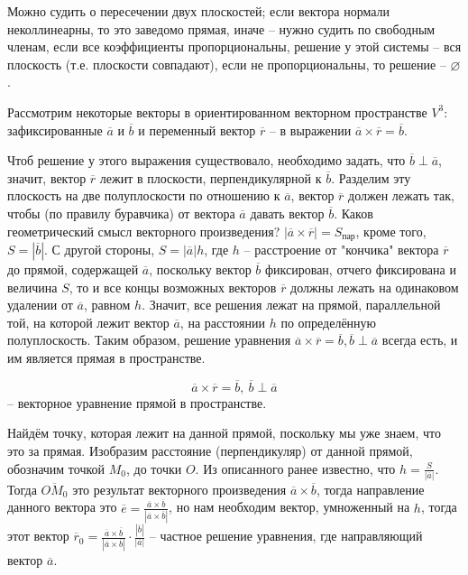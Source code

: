 	\begin{Rem}
		Можно судить о пересечении двух плоскостей; если вектора нормали неколлинеарны, то это заведомо прямая, иначе -- нужно судить по свободным членам, 
		если все коэффициенты пропорциональны, решение у этой системы -- вся плоскость (т.е. плоскости совпадают), если не пропорциональны, то решение -- $\varnothing$.
	\end{Rem}

	Рассмотрим некоторые векторы в ориентированном векторном пространстве $V^3$: зафиксированные $\overline{a}$ и $\overline{b}$ и переменный вектор $\overline{r}$ -- 
	в выражении $\overline{a}\times \overline{r} = \overline{b}$. 
	
	\begin{figure*}[h]
		\centering
		\def\svgwidth{0.4\columnwidth}
		
	\end{figure*}

	Чтоб решение у этого выражения существовало, необходимо задать, что $\overline{b} \perp \overline{a}$, 
	значит, вектор $\overline{r}$ лежит в плоскости, перпендикулярной к $\overline{b}$. Разделим эту плоскость на две полуплоскости по отношению к $\overline{a}$, 
	вектор $\overline{r}$ должен лежать так, чтобы (по правилу буравчика) от вектора $\overline{a}$ давать вектор $\overline{b}$. 
	Каков геометрический смысл векторного произведения? $|\overline{a} \times \overline{r}| = S_{\text{пар}}$, кроме того, $S = |\overline{b}|$. 
	С другой стороны, $S = |\overline{a}| h$, где $h$ -- расстроение от "кончика" вектора $\overline{r}$ до прямой, содержащей $\overline{a}$, поскольку вектор $\overline{b}$ фиксирован,
	отчего фиксирована и величина $S$, то и все концы возможных векторов $\overline{r}$ должны лежать на одинаковом удалении от $\overline{a}$, равном $h$. 
	Значит, все решения лежат на прямой, параллельной той, на которой лежит вектор $\overline{a}$, на расстоянии $h$ по определённую полуплоскость.
	Таким образом, решение уравнения $\overline{a}\times \overline{r} = \overline{b}, \overline{b} \perp \overline{a}$ всегда есть, и им является прямая в пространстве.\\ 
	
	\begin{Def}
		$$\overline{a} \times \overline{r} = \overline{b}, \ \overline{b} \perp \overline{a}$$ -- векторное уравнение прямой в пространстве.
	\end{Def}

	Найдём точку, которая лежит на данной прямой, поскольку мы уже знаем, что это за прямая.
	Изобразим расстояние (перпендикуляр) от данной прямой, обозначим точкой $M_0$, до точки $O$. Из описанного ранее известно, что $h = \frac{S}{|\overline{a}|}$. 
	Тогда $\overline{OM_0}$ это результат векторного произведения $\overline{a} \times \overline{b}$, тогда направление данного вектора это $\overline{e} = \frac{\overline{a} \times \overline{b}}{|\overline{a} \times \overline{b}|}$,
	но нам необходим вектор, умноженный на $h$, тогда этот вектор $\overline{r}_0 = \frac{\overline{a} \times \overline{b}}{|\overline{a} \times \overline{b}|} \cdot \frac{|\overline{b}|}{|\overline{a}|}$ -- частное решение уравнения, где направляющий вектор $\overline{a}$. 

	\begin{figure*}[h]
		\centering
		\def\svgwidth{0.4\columnwidth}
		
	\end{figure*}


